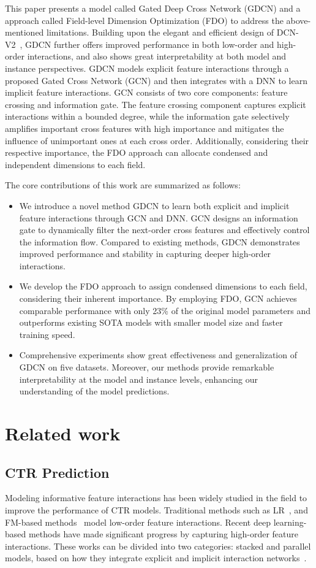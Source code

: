 \documentclass[sigconf]{acmart}
\begin{document}
This paper presents a model called Gated Deep Cross Network (GDCN) and a approach called Field-level Dimension Optimization (FDO) to address the above-mentioned limitations. Building upon the elegant and efficient design of DCN-V2~\cite{wang2021dcnm}, GDCN further offers improved performance in both low-order and high-order interactions, and also shows great interpretability at both model and instance perspectives. GDCN models explicit feature interactions through a proposed Gated Cross Network (GCN) and then integrates with a DNN to learn implicit feature interactions. GCN consists of two core components: feature crossing and information gate. The feature crossing component captures explicit interactions within a bounded degree, while the information gate selectively amplifies important cross features with high importance and mitigates the influence of unimportant ones at each cross order. Additionally, considering their respective importance, the FDO approach can allocate condensed and independent dimensions to each field. 


The core contributions of this work are summarized as follows:
\begin{itemize}[leftmargin=0.4cm]
 \item We introduce a novel method GDCN to learn both explicit and implicit feature interactions through GCN and DNN. GCN designs an information gate to dynamically filter the next-order cross features and effectively control the information flow. Compared to existing methods, GDCN demonstrates improved performance and stability in capturing deeper high-order interactions.
 \item We develop the FDO approach to assign condensed dimensions to each field, considering their inherent importance. By employing FDO, GCN achieves comparable performance with only 23\% of the original model parameters and outperforms existing SOTA models with smaller model size and faster training speed. 
 \item Comprehensive experiments show great effectiveness and generalization of GDCN on five datasets. Moreover, our methods provide remarkable interpretability at the model and instance levels, enhancing our understanding of the model predictions.
\end{itemize}

\section{Related work}
\subsection{CTR Prediction}
Modeling informative feature interactions has been widely studied in the field to improve the performance of CTR models. Traditional methods such as LR~\cite{richardson2007predicting}, and FM-based methods~\cite{rendle2012factorization, blondel2016higher, juan2016field} model low-order feature interactions. Recent deep learning-based methods have made significant progress by capturing high-order feature interactions. These works can be divided into two categories: stacked and parallel models, based on how they integrate explicit and implicit interaction networks~\cite{chen2021enhancing, wang2022enhancing}.
\end{document}
